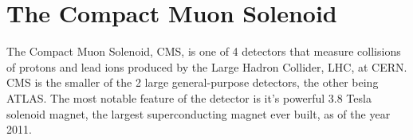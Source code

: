\vspace{-3pt}
\section{The Compact Muon Solenoid}\label{sec:ch2:cms}

The Compact Muon Solenoid, CMS, is one of 4 detectors that measure collisions of protons and lead ions produced by the Large Hadron Collider, LHC, at CERN. CMS is the smaller of the 2 large general-purpose detectors, the other being ATLAS. The most notable feature of the detector is it's powerful 3.8 Tesla solenoid magnet, the largest superconducting magnet ever built, as of the year 2011.



